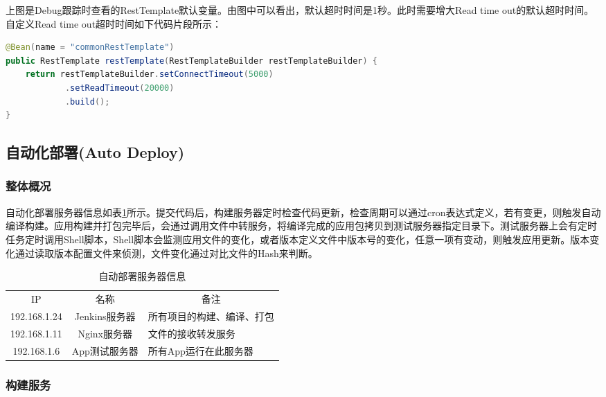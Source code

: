 \documentclass{book}
\begin{document}
上图是Debug跟踪时查看的RestTemplate默认变量。由图中可以看出，默认超时时间是1秒。此时需要增大Read time out的默认超时时间。自定义Read time out超时时间如下代码片段所示：

\begin{lstlisting}[language=Java]
@Bean(name = "commonRestTemplate")
public RestTemplate restTemplate(RestTemplateBuilder restTemplateBuilder) {
	return restTemplateBuilder.setConnectTimeout(5000)
			.setReadTimeout(20000)
			.build();
}
\end{lstlisting}



\subsection{自动化部署(Auto Deploy)}

\subsubsection{整体概况}

自动化部署服务器信息如表\ref{table:databaseconnectionpool}所示。提交代码后，构建服务器定时检查代码更新，检查周期可以通过cron表达式定义，若有变更，则触发自动编译构建。应用构建并打包完毕后，会通过调用文件中转服务，将编译完成的应用包拷贝到测试服务器指定目录下。测试服务器上会有定时任务定时调用Shell脚本，Shell脚本会监测应用文件的变化，或者版本定义文件中版本号的变化，任意一项有变动，则触发应用更新。版本变化通过读取版本配置文件来侦测，文件变化通过对比文件的Hash来判断。

\begin{table}[htbp]
	\caption{自动部署服务器信息}
	\label{table:databaseconnectionpool}
	\begin{center}
		\begin{tabular}{|c|c|p{7cm}|}
			\hline
			\multirow{1}{*}{IP}
			& \multicolumn{1}{c|}{名称} 
			& \multicolumn{1}{c|}{备注}\\			
			\cline{1-3}
			192.168.1.24 &  Jenkins服务器  & 所有项目的构建、编译、打包 \\
			\hline
			192.168.1.11 & Nginx服务器 & 文件的接收转发服务 \\
			\hline
			192.168.1.6 & App测试服务器 & 所有App运行在此服务器 \\
			\hline				
		\end{tabular}	
	\end{center}
\end{table}


\subsubsection{构建服务}
\end{document}
